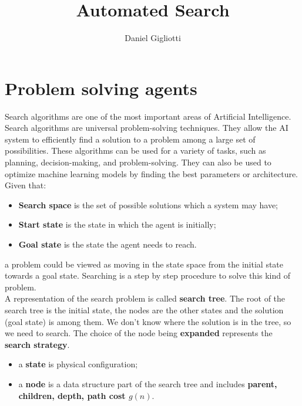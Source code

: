 \documentclass{article}
\title{Automated Search}
\author{Daniel Gigliotti}
\date{}
\begin{document}
\maketitle

\section{Problem solving agents}

Search algorithms are one of the most important areas of Artificial Intelligence.\\ 

Search algorithms are universal problem-solving techniques. They allow the AI system to efficiently find a solution to a problem among a large set of possibilities. These algorithms can be used for a variety of tasks, such as planning, decision-making, and problem-solving. They can also be used to optimize machine learning models by finding the best parameters or architecture. \\

Given that:

\begin{center}
    \begin{itemize}
        \item \textbf{Search space} is the set of possible solutions which a system may have;
        \item \textbf{Start state} is the state in which the agent is initially;
        \item \textbf{Goal state} is the state the agent needs to reach.
    \end{itemize}
\end{center}

a problem could be viewed as moving in the state space from the initial state towards a goal state. Searching is a step by step procedure to solve this kind of problem. \\

A representation of the search problem is called \textbf{search tree}. The root of the search tree is the initial state, the nodes are the other states and the solution (goal state) is among them. We don't know where the solution is in the tree, so we need to search. The choice of the node being \textbf{expanded} represents the \textbf{search strategy}. \\

\begin{itemize}
    \item a \textbf{state} is physical configuration;
    \item a \textbf{node} is a data structure part of the search tree and includes \textbf{parent, children, depth, path cost $g(n)$}. 
\end{itemize}
\end{document}

